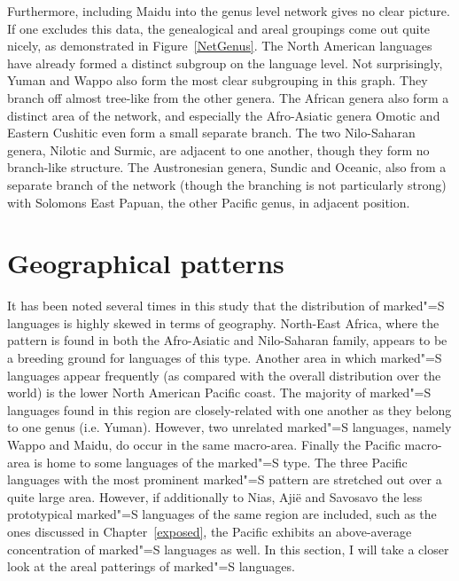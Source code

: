 Furthermore, including Maidu into the genus level network gives no clear picture. 
If one excludes this data, the genealogical and areal groupings come out quite nicely, as demonstrated in Figure~\ref{NetGenus}.
The North American languages have already formed a distinct subgroup on the language level. 
Not surprisingly, Yuman and Wappo also form the most clear subgrouping in this graph. 
They branch off almost tree-like from the other genera. 
The African genera also form a distinct area of the network, and especially the Afro-Asiatic genera Omotic and Eastern Cushitic even form a small separate branch. 
The two Nilo-Saharan genera, Nilotic and Surmic, are adjacent to one another, though they form no branch-like structure. 
The Austronesian genera, Sundic and Oceanic, also from a separate branch of the network (though the branching is not particularly strong) with Solomons East Papuan, the other Pacific genus, in adjacent position.



\section{Geographical patterns}\label{area}

It has been noted several times in this study that the distribution of marked"=S languages is highly skewed in terms of geography.
\enlargethispage{\baselineskip}
North-East Africa, where the pattern is found in both the Afro-Asiatic and Nilo-Saharan family, appears to be a breeding ground for languages of this type. 
Another area in which marked"=S languages appear frequently (as compared with the overall distribution over the world) is the lower North American Pacific coast. 
The majority of marked"=S languages found in this region are closely-related with one another as they belong to one genus (i.e. Yuman). 
However, two unrelated marked"=S languages, namely Wappo and Maidu, do occur in the same macro-area.
Finally the Pacific macro-area is home to some languages of the marked"=S type.
The three Pacific languages with the most prominent marked"=S pattern are stretched out over a quite large area. 
However, if additionally to Nias, Aji\"e and Savosavo the less prototypical marked"=S languages of the same region are included, such as the ones discussed in Chapter~\ref{exposed}, the Pacific exhibits an above-average concentration of marked"=S languages as well. 
\enlargethispage{\baselineskip}
In this section, I will take a closer look at the areal patterings of marked"=S languages.

